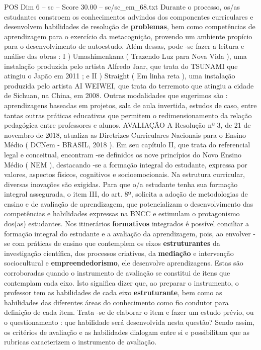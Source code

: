 \begin{textsample}{POS Dim 6 – sc – Score 30.00 – sc/sc\_em\_68.txt}
Durante o processo, os/as estudantes constroem os conhecimentos advindos dos componentes curriculares e desenvolvem habilidades de resolução de \textbf{problemas}, bem como competências de aprendizagem para o exercício da metacognição, provendo um ambiente propício para o desenvolvimento de autoestudo.
Além dessas, pode -se fazer a leitura e análise das obras : I ) Umashimenkana ( Trazendo Luz para Nova Vida ), uma instalação produzida pelo artista Alfredo Jaar, que trata do TSUNAMI que atingiu o Japão em 2011 ; e II ) Straight ( Em linha reta ), uma instalação produzida pelo artista AI WEIWEI, que trata do terremoto que atingiu a cidade de Sichuan, na China, em 2008.
Outras modalidades que sugerimos são : aprendizagens baseadas em projetos, sala de aula invertida, estudos de caso, entre tantas outras práticas educativas que permitem o redimensionamento da relação pedagógica entre professores e alunos.
AVALIAÇÃO A Resolução nº 3, de 21 de novembro de 2018, atualiza as Diretrizes Curriculares Nacionais para o Ensino Médio ( DCNem - BRASIL, 2018 ).
Em seu capítulo II, que trata do referencial legal e conceitual, encontram -se definidos os nove princípios do Novo Ensino Médio ( NEM ), destacando -se a formação integral do estudante, expressa por valores, aspectos físicos, cognitivos e socioemocionais.
Na estrutura curricular, diversas inovações são exigidas.
Para que o/a estudante tenha sua formação integral assegurada, o item III, do art. 8º, solicita a adoção de metodologias de ensino e de avaliação de aprendizagem, que potencializam o desenvolvimento das competências e habilidades expressas na BNCC e estimulam o protagonismo dos(as) estudantes.
Nos itinerários \textbf{formativos} integrados é possível conciliar a formação integral do estudante e a avaliação da aprendizagem, pois, ao envolver -se com práticas de ensino que contemplem os eixos \textbf{estruturantes} da investigação científica, dos processos criativos, da \textbf{mediação} e intervenção sociocultural e \textbf{empreendedorismo}, ele desenvolve aprendizagens.
Estas são corroboradas quando o instrumento de avaliação se constitui de itens que contemplam cada eixo.
Isto significa dizer que, ao preparar o instrumento, o professor tem as habilidades de cada eixo \textbf{estruturante}, bem como as habilidades das diferentes áreas do conhecimento como fio condutor para definição de cada item.
Trata -se de elaborar o item e fazer um estudo prévio, ou o questionamento : que habilidade será desenvolvida nesta questão?
Sendo assim, os critérios de avaliação e as habilidades dialogam entre si e possibilitam que as rubricas caracterizem o instrumento de avaliação.

\end{textsample}
